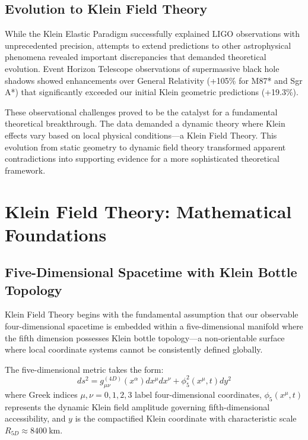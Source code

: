 \documentclass[12pt]{iopart}
\newcommand{\phifive}{\phi_5}
\newcommand{\Rfive}{R_{5D}}
\begin{document}
\subsection{Evolution to Klein Field Theory}

While the Klein Elastic Paradigm successfully explained LIGO observations with unprecedented precision, attempts to extend predictions to other astrophysical phenomena revealed important discrepancies that demanded theoretical evolution. Event Horizon Telescope observations of supermassive black hole shadows showed enhancements over General Relativity (+105\% for M87* and Sgr A*) that significantly exceeded our initial Klein geometric predictions (+19.3\%).

These observational challenges proved to be the catalyst for a fundamental theoretical breakthrough. The data demanded a dynamic theory where Klein effects vary based on local physical conditions—a Klein Field Theory. This evolution from static geometry to dynamic field theory transformed apparent contradictions into supporting evidence for a more sophisticated theoretical framework.

\section{Klein Field Theory: Mathematical Foundations}

\subsection{Five-Dimensional Spacetime with Klein Bottle Topology}

Klein Field Theory begins with the fundamental assumption that our observable four-dimensional spacetime is embedded within a five-dimensional manifold where the fifth dimension possesses Klein bottle topology—a non-orientable surface where local coordinate systems cannot be consistently defined globally.

The five-dimensional metric takes the form:
\begin{equation}
ds^2 = g_{\mu\nu}^{(4D)}(x^\alpha) dx^\mu dx^\nu + \phifive^2(x^\mu, t) dy^2
\label{eq:5d_metric}
\end{equation}
where Greek indices $\mu,\nu = 0,1,2,3$ label four-dimensional coordinates, $\phifive(x^\mu, t)$ represents the dynamic Klein field amplitude governing fifth-dimensional accessibility, and $y$ is the compactified Klein coordinate with characteristic scale $\Rfive \approx \SI{8400}{\kilo\meter}$.
\end{document}
